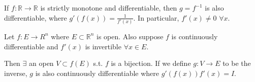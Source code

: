 \begin{theorem}
  If $ f \colon \mathbb{R} \to \mathbb{R} $ 
  is strictly monotone and differentiable,
  then $ g = f^{-1} $ is also differentiable,
  where  $ g'(f(x)) = \frac{1}{f'(x)} $.
  In particular, $ f'(x) \neq 0 $  $  \forall x $.
\end{theorem}

\begin{theorem}
  Let $ f \colon E \to R^n $ where  $ E \subset \mathbb{R}^n $ is open.
  Also suppose $ f $ is continuously differentiable
  and $ f'(x) $ is invertible $ \forall x \in E $.

  Then $ \exists $ an open $ V \subset f(E) $
  s.t.  $ f $ is a bijection.
  If we define $ g \colon V \to E $ 
  to be the inverse,
  $ g $ is also continuously differentiable
  where  $ g'(f(x))f'(x) = I $.
\end{theorem}
